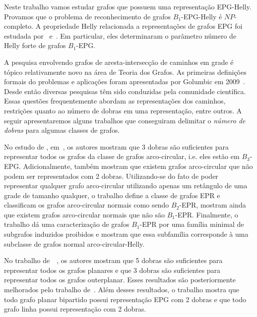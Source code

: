 Neste trabalho vamos estudar grafos que possuem uma representação EPG-Helly. Provamos que o problema de reconhecimento de grafos  $ B_1$-EPG-Helly é $NP$-completo. A propriedade Helly relacionada a representações de grafos EPG foi estudada por~\cite{golumbic2013} e~\cite{golumbic2009}. Em particular, eles determinaram o parâmetro  número de Helly forte de grafos $B_1$-EPG. 


 A pesquisa envolvendo grafos de aresta-intersecção de caminhos em grade é tópico relativamente novo na área de Teoria dos Grafos. As primeiras definições formais do problemas e aplicações foram apresentadas por Golumbic em 2009~\cite{golumbic2009}. Desde então diversas pesquisas têm sido conduzidas pela comunidade científica. Essas questões frequentemente abordam as representações dos caminhos, restrições quanto ao número de dobras em uma representação, entre outros. A seguir apresentaremos alguns trabalhos que conseguiram delimitar o \textit{número de dobras} para algumas classes de grafos.

No estudo de \citeauthor{alcon2016}, em~\cite{alcon2016}, os autores mostram que 3 dobras são suficientes para representar todos os grafos da classe de grafos arco-circular, i.e. eles estão em $B_3$-EPG. Adicionalmente, também mostram que existem grafos arco-circular que não podem ser representados com 2 dobras. Utilizando-se do fato de poder representar qualquer grafo arco-circular utilizando apenas um retângulo de uma grade de tamanho qualquer, o trabalho define a classe de grafos EPR e classificam os grafos arco-circular normais como sendo $B_2$-EPR, mostram ainda que existem grafos arco-circular normais que não são $B_1$-EPR. Finalmente, o trabalho dá uma caracterização de grafos $B_1$-EPR por uma família minimal de subgrafos induzidos proibidos e mostram que essa subfamília corresponde à uma subclasse de grafos normal arco-circular-Helly.

No trabalho de~\citeauthor{biedl2010}~\cite{biedl2010}, os autores mostram que 5 dobras são suficientes para representar todos os grafos planares e que 3 dobras são suficientes para representar todos os grafos outerplanar. Esses  resultados são posteriormente melhorados pelo trabalho de~\cite{daniel2014b}. Além desses resultados, o trabalho mostra que todo grafo planar bipartido possui representação EPG com 2 dobras e que todo grafo linha possui representação com 2 dobras. 


